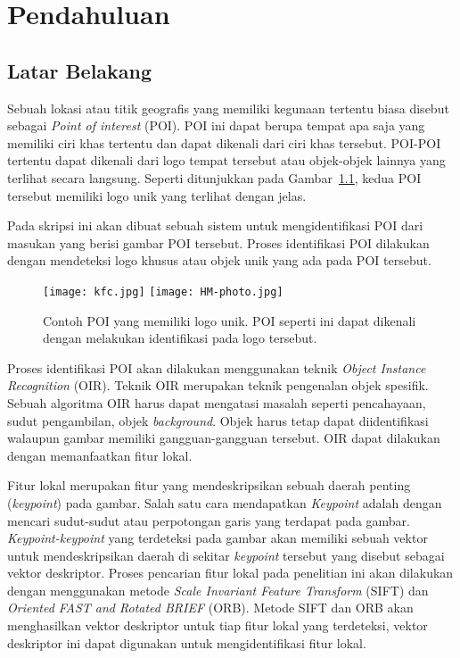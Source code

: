 \chapter{Pendahuluan}
\label{chap:intro}
   
\section{Latar Belakang}
\label{sec:label}

Sebuah lokasi atau titik geografis yang memiliki kegunaan tertentu biasa disebut sebagai \textit{Point of interest} (POI). POI ini dapat berupa tempat apa saja yang memiliki ciri khas tertentu dan dapat dikenali dari ciri khas tersebut. POI-POI tertentu dapat dikenali dari logo tempat tersebut atau objek-objek lainnya yang terlihat secara langsung. Seperti ditunjukkan pada Gambar~\ref{fig:poi_with_logo}, kedua POI tersebut memiliki logo unik yang terlihat dengan jelas.

Pada skripsi ini akan dibuat sebuah sistem untuk mengidentifikasi POI dari masukan yang berisi gambar POI tersebut. Proses identifikasi POI dilakukan dengan mendeteksi logo khusus atau objek unik yang ada pada POI tersebut.
\begin{figure}[H]
	\centering
	\texttt{[image: kfc.jpg]}
	\texttt{[image: HM-photo.jpg]}
	\caption{Contoh POI yang memiliki logo unik. POI seperti ini dapat dikenali dengan melakukan identifikasi pada logo tersebut.}
	\label{fig:poi_with_logo}
\end{figure}

Proses identifikasi POI akan dilakukan menggunakan teknik \textit{Object Instance Recognition} (OIR). Teknik OIR merupakan teknik pengenalan objek spesifik. Sebuah algoritma OIR harus dapat mengatasi masalah seperti pencahayaan, sudut pengambilan, objek \textit{background}. Objek harus tetap dapat diidentifikasi walaupun gambar memiliki gangguan-gangguan tersebut. OIR dapat dilakukan dengan memanfaatkan fitur lokal.

Fitur lokal merupakan fitur yang mendeskripsikan sebuah daerah penting (\textit{keypoint}) pada gambar. Salah satu cara mendapatkan \textit{Keypoint} adalah dengan mencari sudut-sudut atau perpotongan garis yang terdapat pada gambar. \textit{Keypoint-keypoint} yang terdeteksi pada gambar akan memiliki sebuah vektor untuk mendeskripsikan daerah di sekitar \textit{keypoint} tersebut yang disebut sebagai vektor deskriptor. Proses pencarian fitur lokal pada penelitian ini akan dilakukan dengan menggunakan metode \textit{Scale Invariant Feature Transform} (SIFT) dan \textit{Oriented FAST and Rotated BRIEF} (ORB). Metode SIFT dan ORB akan menghasilkan vektor deskriptor untuk tiap fitur lokal yang terdeteksi, vektor deskriptor ini dapat digunakan untuk mengidentifikasi fitur lokal.

